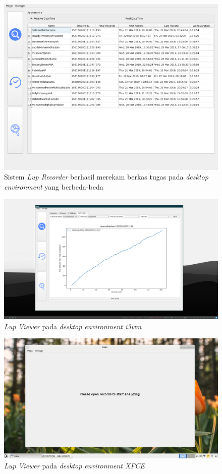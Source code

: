 \begin{figure}[tph]
  \centering
  \includegraphics[angle=90,width=1.1\linewidth]{img/compatibility-res1}
  \caption{Sistem \emph{Lup Recorder} berhasil merekam berkas tugas pada \emph{desktop environment} yang berbeda-beda}
  \label{fig:compatibility-test}
\end{figure}

\begin{figure}[tph]
  \centering
  \includegraphics[width=.9\linewidth]{img/compatibility-i3wm}
  \caption{\emph{Lup Viewer} pada \emph{desktop environment i3wm}}
  \label{fig:compatibility-i3wm}
\end{figure}

\begin{figure}[tph]
  \centering
  \includegraphics[width=.9\linewidth]{img/compatibility-xfce}
  \caption{\emph{Lup Viewer} pada \emph{desktop environment XFCE}}
  \label{fig:compatibility-xfce}
\end{figure}

